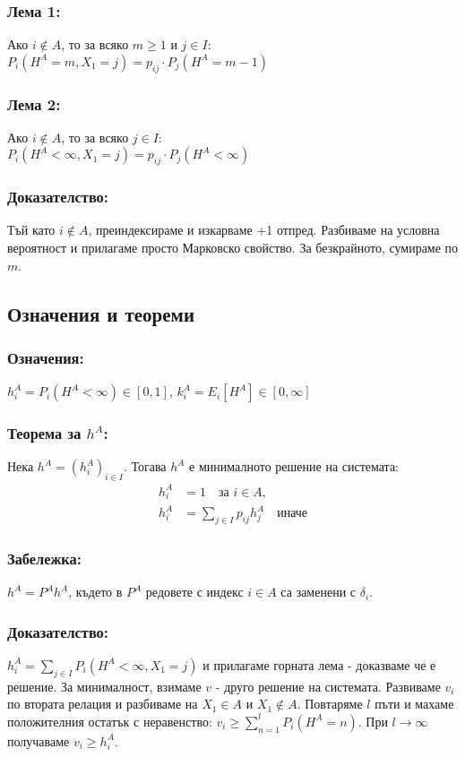 \documentclass{article}
\begin{document}
\subsubsection*{Лема 1:}
Ако $i \notin A$, то за всяко $m \geq 1$ и $j \in I$: \\
$P_i(H^A = m, X_1 = j) = p_{ij} \cdot P_j(H^A = m-1)$

\subsubsection*{Лема 2:}
Ако $i \notin A$, то за всяко $j \in I$: \\
$P_i(H^A < \infty, X_1 = j) = p_{ij} \cdot P_j(H^A < \infty)$

\subsubsection*{Доказателство:}
Тъй като $i \notin A$, преиндексираме и изкарваме +1 отпред. Разбиваме на условна вероятност и прилагаме просто Марковско свойство. За безкрайното, сумираме по $m$.

\subsection{Означения и теореми}
\subsubsection*{Означения:}
$h_i^A = P_i(H^A < \infty) \in [0, 1]$, \quad $k_i^A = E_i[H^A] \in [0, \infty]$

\subsubsection*{Теорема за $h^A$:}
Нека $h^A = (h_i^A)_{i \in I}$. Тогава $h^A$ е минималното решение на системата:
\begin{align*}
h_i^A &= 1 \quad \text{за } i \in A, \\
h_i^A &= \sum_{j \in I} p_{ij} h_j^A \quad \text{иначе}
\end{align*}

\subsubsection*{Забележка:}
$h^A = P^A h^A$, където в $P^A$ редовете с индекс $i \in A$ са заменени с $\delta_i$.

\subsubsection*{Доказателство:}
$h_i^A = \sum_{j \in I} P_i(H^A < \infty, X_1 = j)$ и прилагаме горната лема - доказваме че е решение. 
За минималност, взимаме $v$ - друго решение на системата. 
Развиваме $v_i$ по втората релация и разбиваме на $X_1 \in A$ и $X_1 \notin A$. 
Повтаряме $l$ пъти и махаме положителния остатък с неравенство: $v_i \geq \sum_{n=1}^l P_i(H^A = n)$. 
При $l \to \infty$ получаваме $v_i \geq h_i^A$.
\end{document}
